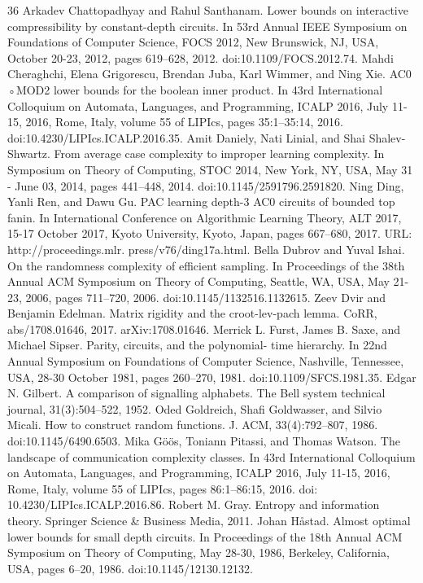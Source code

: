 \begin{thebibliography}{36}
Arkadev Chattopadhyay and Rahul Santhanam. Lower bounds on interactive compressibility by constant-depth circuits. In 53rd Annual IEEE Symposium on Foundations of Computer Science, FOCS 2012, New Brunswick, NJ, USA, October 20-23, 2012, pages 619–628, 2012. doi:10.1109/FOCS.2012.74.
Mahdi Cheraghchi, Elena Grigorescu, Brendan Juba, Karl Wimmer, and Ning Xie. AC0 ◦MOD2 lower bounds for the boolean inner product. In 43rd International Colloquium on Automata, Languages, and Programming, ICALP 2016, July 11-15, 2016, Rome, Italy, volume 55 of LIPIcs, pages 35:1–35:14, 2016. doi:10.4230/LIPIcs.ICALP.2016.35.
Amit Daniely, Nati Linial, and Shai Shalev-Shwartz. From average case complexity to improper learning complexity. In Symposium on Theory of Computing, STOC 2014, New York, NY, USA, May 31 - June 03, 2014, pages 441–448, 2014. doi:10.1145/2591796.2591820.
Ning Ding, Yanli Ren, and Dawu Gu. PAC learning depth-3 AC0 circuits of bounded top fanin. In International Conference on Algorithmic Learning Theory, ALT 2017, 15-17 October 2017, Kyoto University, Kyoto, Japan, pages 667–680, 2017. URL: http://proceedings.mlr. press/v76/ding17a.html.
Bella Dubrov and Yuval Ishai. On the randomness complexity of efficient sampling. In Proceedings of the 38th Annual ACM Symposium on Theory of Computing, Seattle, WA, USA, May 21-23, 2006, pages 711–720, 2006. doi:10.1145/1132516.1132615.
Zeev Dvir and Benjamin Edelman. Matrix rigidity and the croot-lev-pach lemma. CoRR, abs/1708.01646, 2017. arXiv:1708.01646.
Merrick L. Furst, James B. Saxe, and Michael Sipser. Parity, circuits, and the polynomial- time hierarchy. In 22nd Annual Symposium on Foundations of Computer Science, Nashville, Tennessee, USA, 28-30 October 1981, pages 260–270, 1981. doi:10.1109/SFCS.1981.35.
Edgar N. Gilbert. A comparison of signalling alphabets. The Bell system technical journal, 31(3):504–522, 1952.
Oded Goldreich, Shafi Goldwasser, and Silvio Micali. How to construct random functions. J. ACM, 33(4):792–807, 1986. doi:10.1145/6490.6503.
Mika Göös, Toniann Pitassi, and Thomas Watson. The landscape of communication complexity classes. In 43rd International Colloquium on Automata, Languages, and Programming, ICALP 2016, July 11-15, 2016, Rome, Italy, volume 55 of LIPIcs, pages 86:1–86:15, 2016. doi: 10.4230/LIPIcs.ICALP.2016.86.
Robert M. Gray. Entropy and information theory. Springer Science \& Business Media, 2011.
Johan Håstad. Almost optimal lower bounds for small depth circuits. In Proceedings of the 18th Annual ACM Symposium on Theory of Computing, May 28-30, 1986, Berkeley, California, USA, pages 6–20, 1986. doi:10.1145/12130.12132.

\end{thebibliography}
